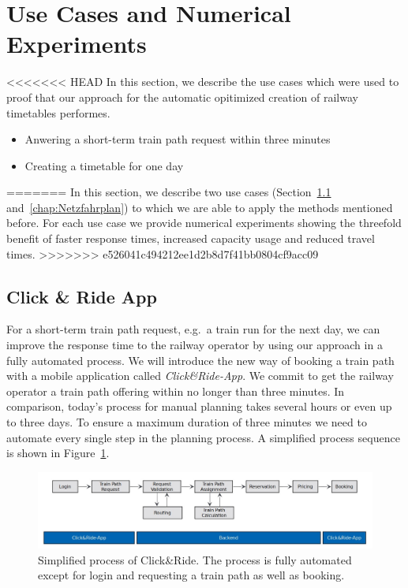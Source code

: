 \section{Use Cases and Numerical Experiments}
\label{chap:useCases}
<<<<<<< HEAD
In this section, we describe the use cases which were used to proof that our approach for the automatic opitimized creation of railway timetables performes. 

\begin{itemize}
	\item[1)] Anwering a short-term train path request within three minutes
	\item[2)] Creating a timetable for one day 
\end{itemize}
=======
In this section, we describe two use cases (Section~\ref{chap:CnR} and~\ref{chap:Netzfahrplan}) to which we are able to apply the methods mentioned before. For each use case we provide numerical experiments showing the threefold benefit of faster response times, increased capacity usage and reduced travel times.
>>>>>>> e526041c494212ee1d2b8d7f41bb0804cf9acc09

\subsection{Click \& Ride App}
\label{chap:CnR}
For a short-term train path request, e.g.\ a train run for the next day, we can improve the response time to the railway operator by using our approach in a fully automated process. We will introduce the new way of booking a train path with a mobile application called \emph{Click\&Ride-App}. We commit to get the railway operator a train path offering within no longer than three minutes. In comparison, today's process for manual planning takes several hours or even up to three days. To ensure a maximum duration of three minutes we need to automate every single step in the planning process. A simplified process sequence is shown in Figure~\ref{fig:process_sequence}. 
%
\begin{figure}[htb]
	\centering
	\includegraphics[width=\textwidth]{Bilder/process_sequence.jpg}
	\caption{Simplified process of Click\&Ride. The process is fully automated except for login and requesting a train path as well as booking.}
	\label{fig:process_sequence}
\end{figure}

